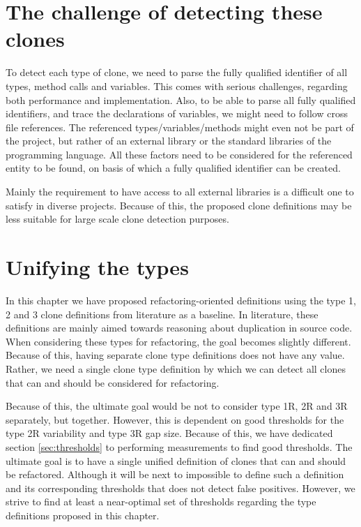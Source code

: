 \section{The challenge of detecting these clones}\label{chap:challenge}
To detect each type of clone, we need to parse the fully qualified identifier of all types, method calls and variables. This comes with serious challenges, regarding both performance and implementation. Also, to be able to parse all fully qualified identifiers, and trace the declarations of variables, we might need to follow cross file references. The referenced types/variables/methods might even not be part of the project, but rather of an external library or the standard libraries of the programming language. All these factors need to be considered for the referenced entity to be found, on basis of which a fully qualified identifier can be created.

Mainly the requirement to have access to all external libraries is a difficult one to satisfy in diverse projects. Because of this, the proposed clone definitions may be less suitable for large scale clone detection purposes.

\section{Unifying the types}\label{sec:unifying}
In this chapter we have proposed refactoring-oriented definitions using the type 1, 2 and 3 clone definitions from literature as a baseline. In literature, these definitions are mainly aimed towards reasoning about duplication in source code. When considering these types for refactoring, the goal becomes slightly different. Because of this, having separate clone type definitions does not have any value. Rather, we need a single clone type definition by which we can detect all clones that can and should be considered for refactoring.

Because of this, the ultimate goal would be not to consider type 1R, 2R and 3R separately, but together. However, this is dependent on good thresholds for the type 2R variability and type 3R gap size. Because of this, we have dedicated section \ref{sec:thresholds} to performing measurements to find good thresholds. The ultimate goal is to have a single unified definition of clones that can and should be refactored. Although it will be next to impossible to define such a definition and its corresponding thresholds that does not detect false positives. However, we strive to find at least a near-optimal set of thresholds regarding the type definitions proposed in this chapter.


